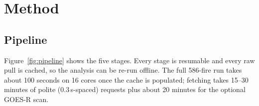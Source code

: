 \documentclass[11pt,a4paper]{article}
\begin{document}
\section{Method}

\subsection{Pipeline}

Figure~\ref{fig:pipeline} shows the five stages. Every stage is resumable and every raw pull is cached, so the
analysis can be re-run offline. The full 586-fire run takes about 100 seconds on 16 cores once the cache is
populated; fetching takes 15--30 minutes of polite (0.3\,s-spaced) requests plus about 20 minutes for the optional
GOES-R scan.
\end{document}
